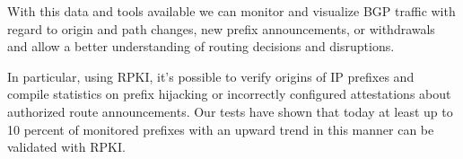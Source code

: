 \documentclass[a0,portrait,posterdraft]{a0poster}
\begin{document}
\begin{mybox}
\begin{multicols}{3}
With this data and tools available we can monitor and visualize BGP traffic with
regard to origin and path changes, new prefix announcements, or withdrawals and
allow a better understanding of routing decisions and disruptions.

\noindent In particular, using RPKI, it's possible to verify origins of IP
prefixes and compile statistics on prefix hijacking or incorrectly configured
attestations about authorized route announcements. Our tests have shown that
today at least up to 10 percent of monitored prefixes with an upward trend in
this manner can be validated with RPKI.

\vfill

\normalsize
\nocite{*}


\end{multicols}
\end{mybox}
\vfill
\end{document}
